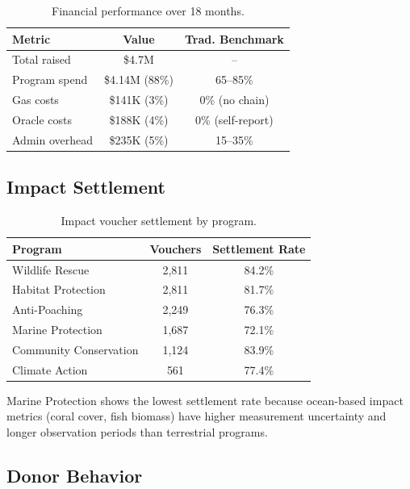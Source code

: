 \documentclass[11pt,letterpaper]{article}
\begin{document}
\begin{table}[t]
\centering
\begin{tabular}{lcc}
\toprule
\textbf{Metric} & \textbf{Value} & \textbf{Trad. Benchmark} \\
\midrule
Total raised & \$4.7M & -- \\
Program spend & \$4.14M (88\%) & 65--85\% \\
Gas costs & \$141K (3\%) & 0\% (no chain) \\
Oracle costs & \$188K (4\%) & 0\% (self-report) \\
Admin overhead & \$235K (5\%) & 15--35\% \\
\bottomrule
\end{tabular}
\caption{Financial performance over 18 months.}
\label{tab:financial}
\end{table}

\subsection{Impact Settlement}

\begin{table}[t]
\centering
\begin{tabular}{lcc}
\toprule
\textbf{Program} & \textbf{Vouchers} & \textbf{Settlement Rate} \\
\midrule
Wildlife Rescue & 2{,}811 & 84.2\% \\
Habitat Protection & 2{,}811 & 81.7\% \\
Anti-Poaching & 2{,}249 & 76.3\% \\
Marine Protection & 1{,}687 & 72.1\% \\
Community Conservation & 1{,}124 & 83.9\% \\
Climate Action & 561 & 77.4\% \\
\bottomrule
\end{tabular}
\caption{Impact voucher settlement by program.}
\label{tab:settlement}
\end{table}

Marine Protection shows the lowest settlement rate because ocean-based impact metrics (coral cover, fish biomass) have higher measurement uncertainty and longer observation periods than terrestrial programs.

\subsection{Donor Behavior}
\end{document}
